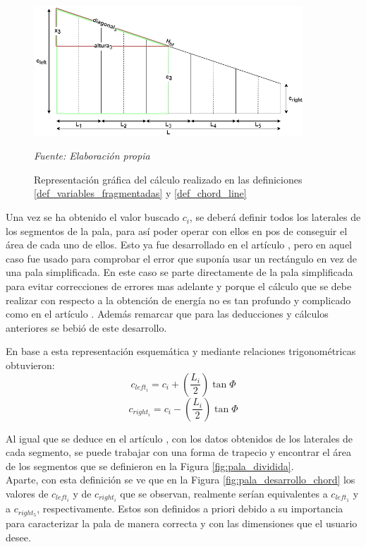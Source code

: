 \begin{figure}[H]
    \centering
    \includegraphics[width=0.9\textwidth]{images/Trapecio calculo x.png}
    \caption{Representación gráfica del cálculo realizado en las definiciones \ref{def_variables_fragmentadas} y \ref{def_chord_line}}
    \textit{Fuente: Elaboración propia}
    \label{fig:pala_calculo_phi}
\end{figure}


Una vez se ha obtenido el valor buscado $c_i$, se deberá definir todos los laterales de los segmentos de la pala, para así poder operar con ellos en pos de conseguir el área de cada uno de ellos. Esto ya fue desarrollado en el artículo \cite{armenta2021predictive}, pero en aquel caso fue usado para comprobar el error que suponía usar un rectángulo en vez de una pala simplificada. En este caso se parte directamente de la pala simplificada para evitar correcciones de errores mas adelante y porque el cálculo que se debe realizar con respecto a la obtención de energía no es tan profundo y complicado como en el artículo \cite{armenta2021predictive}. Además remarcar que para las deducciones y cálculos anteriores se bebió de este desarrollo.


\begin{definicion}
En base a esta representación esquemática y mediante relaciones trigonométricas obtuvieron:
$$ c_{left_i} = c_i + (\dfrac{L_i}{2}) \tan \varPhi$$
$$ c_{right_i} = c_i - (\dfrac{L_i}{2}) \tan \varPhi$$
\label{def:laterales_segmento}
\end{definicion}

Al igual que se deduce en el artículo \cite{armenta2021predictive}, con los datos obtenidos de los laterales de cada segmento, se puede trabajar con una forma de trapecio y encontrar el área de los segmentos que se definieron en la Figura \ref{fig:pala_dividida}.\\

Aparte, con esta definición se ve que en la Figura \ref{fig:pala_desarrollo_chord} los valores de $c_{left_i}$ y de $c_{right_i}$ que se observan, realmente serían equivalentes a $c_{left_1}$ y a $c_{right_5}$, respectivamente. Estos son definidos a priori debido a su importancia para caracterizar la pala de manera correcta y con las dimensiones que el usuario desee.

